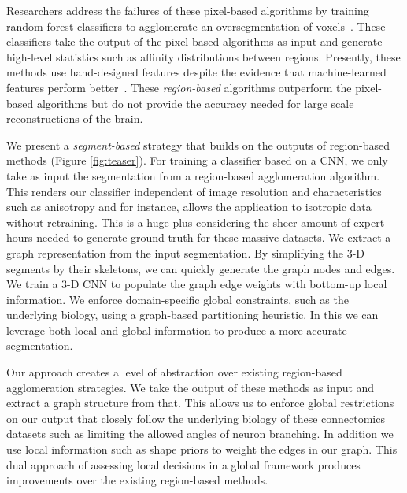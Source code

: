 Researchers address the failures of these pixel-based algorithms by training random-forest classifiers to agglomerate an oversegmentation of voxels~\cite{nunez2014graph,10.1371/journal.pone.0125825}.
These classifiers take the output of the pixel-based algorithms as input and generate high-level statistics such as affinity distributions between regions. 
Presently, these methods use hand-designed features despite the evidence that machine-learned features perform better~\cite{bogovic2013learned}. 
These \textit{region-based} algorithms outperform the pixel-based algorithms but do not provide the accuracy needed for large scale reconstructions of the brain.

We present a \textit{segment-based} strategy that builds on the outputs of region-based methods (Figure \ref{fig:teaser}).
For training a classifier based on a CNN, we only take as input the segmentation from a region-based agglomeration algorithm. 
This renders our classifier independent of image resolution and characteristics such as anisotropy and for instance, allows the application to isotropic data without retraining.
This is a huge plus considering the sheer amount of expert-hours needed to generate ground truth for these massive datasets.
We extract a graph representation from the input segmentation.
By simplifying the 3-D segments by their skeletons, we can quickly generate the graph nodes and edges. 
We train a 3-D CNN to populate the graph edge weights with bottom-up local information. 
We enforce domain-specific global constraints, such as the underlying biology, using a graph-based partitioning heuristic.
In this we can leverage both local and global information to produce a more accurate segmentation.

Our approach creates a level of abstraction over existing region-based agglomeration strategies. 
We take the output of these methods as input and extract a graph structure from that.
This allows us to enforce global restrictions on our output that closely follow the underlying biology of these connectomics datasets such as limiting the allowed angles of neuron branching. 
In addition we use local information such as shape priors to weight the edges in our graph.
This dual approach of assessing local decisions in a global framework produces improvements over the existing region-based methods. 